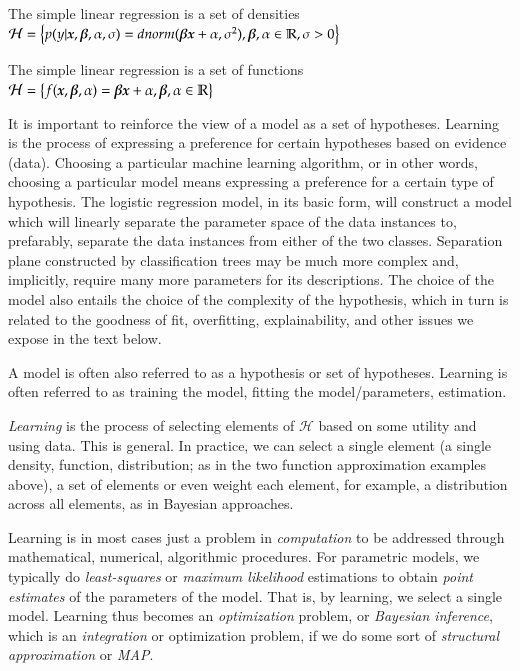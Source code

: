 \begin{refsection}
\begin{example}
The simple linear regression is a set of densities \\
$\mathcal{H} =\left\lbrace p(y|\boldsymbol{x},\boldsymbol{\beta},\alpha, \sigma)  = dnorm(\boldsymbol{\beta}\boldsymbol{x} + \alpha, \sigma^2), \boldsymbol{\beta}, \alpha \in \mathbb{R}, \sigma > 0 \right\rbrace$
\end{example}

\begin{example}
The simple linear regression is a set of functions
$\mathcal{H} =\left\lbrace f(\boldsymbol{x},\boldsymbol{\beta},\alpha) = \boldsymbol{\beta} \boldsymbol{x} + \alpha, \boldsymbol{\beta}, \alpha \in \mathbb{R} \right\rbrace$
\end{example}

It is important to reinforce the view of a model as a set of hypotheses. Learning is the process of expressing a preference for certain hypotheses based on evidence (data). Choosing a particular machine learning algorithm, or in other words, choosing a particular model means expressing a preference for a certain type of hypothesis. The logistic regression model, in its basic form, will construct a model which will linearly separate the parameter space of the data instances to, prefarably, separate the data instances from either of the two classes. Separation plane constructed by classification trees may be much more complex and, implicitly, require many more parameters for its descriptions. The choice of the model also entails the choice of the complexity of the hypothesis, which in turn is related to the goodness of fit, overfitting, explainability, and other issues we expose in the text below.

A model is often also referred to as a hypothesis or set of hypotheses. Learning is often referred to as training the model, fitting the model/parameters, estimation.

{\em Learning} is the process of selecting elements of $\mathcal{H}$ based on some utility and using data. This is general. In practice, we can select a single element (a single density, function, distribution; as in the two function approximation examples above), a set of elements or even weight each element, for example, a distribution across all elements, as in Bayesian approaches.

Learning is in most cases just a problem in {\em computation} to be addressed through mathematical, numerical, algorithmic procedures. For parametric models, we typically do {\em least-squares} or {\em maximum likelihood} estimations to obtain {\em point estimates} of the parameters of the model. That is, by learning, we select a single model. Learning thus becomes an {\em optimization} problem, or {\em Bayesian inference}, which is an {\em integration} or optimization problem, if we do some sort of {\em structural approximation} or {\em MAP}. \



\end{refsection}

